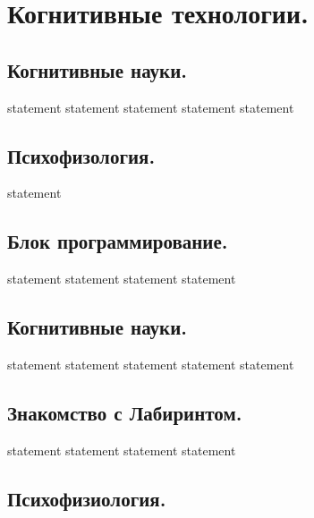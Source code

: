 \chapter{Когнитивные технологии.}

\section{Когнитивные науки.}

{statement}
{statement}
{statement}
{statement}
{statement}

\section{Психофизология.}

{statement}

\section{Блок программирование.}

{statement}
{statement}
{statement}
{statement}

\section{Когнитивные науки.}

{statement}
{statement}
{statement}
{statement}
{statement}

\section{Знакомство с Лабиринтом.}

{statement}
{statement}
{statement}
{statement}

\section{Психофизиология.}

